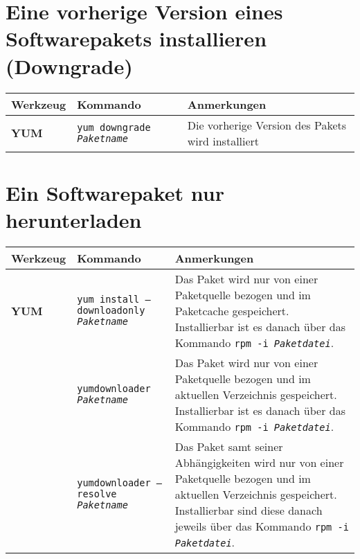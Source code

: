 \documentclass[10pt,a4paper]{article}
\begin{document}
\section{Eine vorherige Version eines Softwarepakets installieren (Downgrade)}
\begin{tabular}{ p{3.5cm} p{9cm} p{11cm}}
  \hline
  \rowcolor{Gray}
  \textbf{Werkzeug} & \textbf{Kommando} & \textbf{Anmerkungen} \\
  \hline 
  \textbf{YUM} & \texttt{yum downgrade \textit{Paketname}} & Die vorherige Version des Pakets wird installiert \\
  \hline
\end{tabular}

\section{Ein Softwarepaket nur herunterladen}
\begin{tabular}{ p{3.5cm} p{9cm} p{11cm}}
  \hline
  \rowcolor{Gray}
  \textbf{Werkzeug} & \textbf{Kommando} & \textbf{Anmerkungen} \\
  \hline 
  \textbf{YUM} & \texttt{yum install --downloadonly \textit{Paketname}} & Das Paket wird nur von einer Paketquelle bezogen und im Paketcache gespeichert. Installierbar ist es danach über das Kommando \texttt{rpm -i \textit{Paketdatei}}.\\
  \rowcolor{Gray}
  & \texttt{yumdownloader \textit{Paketname}} & Das Paket wird nur von einer Paketquelle bezogen und im aktuellen Verzeichnis gespeichert. Installierbar ist es danach über das Kommando \texttt{rpm -i \textit{Paketdatei}}.\\
  & \texttt{yumdownloader --resolve \textit{Paketname}} & Das Paket samt seiner Abhängigkeiten wird nur von einer Paketquelle bezogen und im aktuellen Verzeichnis gespeichert. Installierbar sind diese danach jeweils über das Kommando \texttt{rpm -i \textit{Paketdatei}}.\\
  \hline
\end{tabular}
\end{document}
